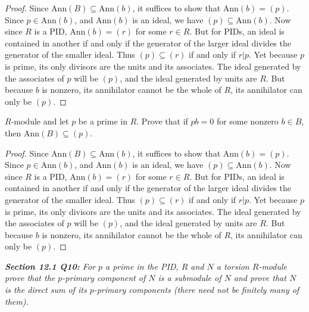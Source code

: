 \documentclass{article}
\begin{document}
  \begin{proof}
    Since $\text{Ann}(B)\subseteq\text{Ann}(b)$, it suffices to show that
    $\text{Ann}(b)=(p)$. Since $p\in\text{Ann}(b)$, and $\text{Ann}(b)$ is
    an ideal, we have $(p)\subseteq\text{Ann}(b)$. Now since $R$ is a PID,
    $\text{Ann}(b)=(r)$ for some $r\in R$. But for PIDs, an ideal is
    contained in another if and only if the generator of the larger ideal
    divides the generator of the smaller ideal. Thus $(p)\subseteq(r)$ if
    and only if $r|p$. Yet because $p$ is prime, its only divisors are the
    units and its associates. The ideal generated by the associates of $p$
    will be $(p)$, and the ideal generated by units are $R$. But because
    $b$ is nonzero, its annihilator cannot be the whole of $R$, its
    annihilator can only be $(p)$.
  \end{proof}
  $R$-module and let $p$ be a prime in $R$. Prove that if $pb=0$ for some
  nonzero $b\in B$, then $\text{Ann}(B)\subseteq(p)$.

  \begin{proof}
    Since $\text{Ann}(B)\subseteq\text{Ann}(b)$, it suffices to show that
    $\text{Ann}(b)=(p)$. Since $p\in\text{Ann}(b)$, and $\text{Ann}(b)$ is
    an ideal, we have $(p)\subseteq\text{Ann}(b)$. Now since $R$ is a PID,
    $\text{Ann}(b)=(r)$ for some $r\in R$. But for PIDs, an ideal is
    contained in another if and only if the generator of the larger ideal
    divides the generator of the smaller ideal. Thus $(p)\subseteq(r)$ if
    and only if $r|p$. Yet because $p$ is prime, its only divisors are the
    units and its associates. The ideal generated by the associates of $p$
    will be $(p)$, and the ideal generated by units are $R$. But because
    $b$ is nonzero, its annihilator cannot be the whole of $R$, its
    annihilator can only be $(p)$.
  \end{proof}

\it \textbf{Section 12.1 Q10:} For $p$ a prime in the PID, $R$ and $N$ a
  torsion $R$-module prove that the $p$-primary component of $N$ is a
  submodule of $N$ and prove that $N$ is the direct sum of its $p$-primary
  components (there need not be finitely many of them).
\end{document}
